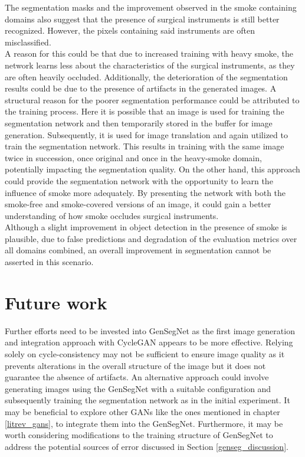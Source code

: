 The segmentation masks and the improvement observed in the smoke containing domains also suggest that the presence of surgical instruments is still better recognized.
However, the pixels containing said instruments are often misclassified.\\
A reason for this could be that due to increased training with heavy smoke, the network learns less about the characteristics of the surgical instruments, as they are often heavily occluded.
Additionally, the deterioration of the segmentation results could be due to the presence of artifacts in the generated images.
A structural reason for the poorer segmentation performance could be attributed to the training process.
Here it is possible that an image is used for training the segmentation network and then temporarily stored in the buffer for image generation. 
Subsequently, it is used for image translation and again utilized to train the segmentation network. 
This results in training with the same image twice in succession, once original and once in the heavy-smoke domain, potentially impacting the segmentation quality.
On the other hand, this approach could provide the segmentation network with the opportunity to learn the influence of smoke more adequately. 
By presenting the network with both the smoke-free and smoke-covered versions of an image, it could gain a better understanding of how smoke occludes surgical instruments.\\
Although a slight improvement in object detection in the presence of smoke is plausible, due to false predictions and degradation of the evaluation metrics over all domains combined, an overall improvement in segmentation cannot be asserted in this scenario.

\section{Future work}
Further efforts need to be invested into GenSegNet as the first image generation and integration approach with CycleGAN appears to be more effective. 
Relying solely on cycle-consistency may not be sufficient to ensure image quality as it prevents alterations in the overall structure of the image but it does not guarantee the absence of artifacts. 
An alternative approach could involve generating images using the GenSegNet with a suitable configuration and subsequently training the segmentation network as in the initial experiment. 
It may be beneficial to explore other GANs like the ones mentioned in chapter \ref{litrev_gans}, to integrate them into the GenSegNet.
Furthermore, it may be worth considering modifications to the training structure of GenSegNet to address the potential sources of error discussed in Section \ref{genseg_discussion}. 

